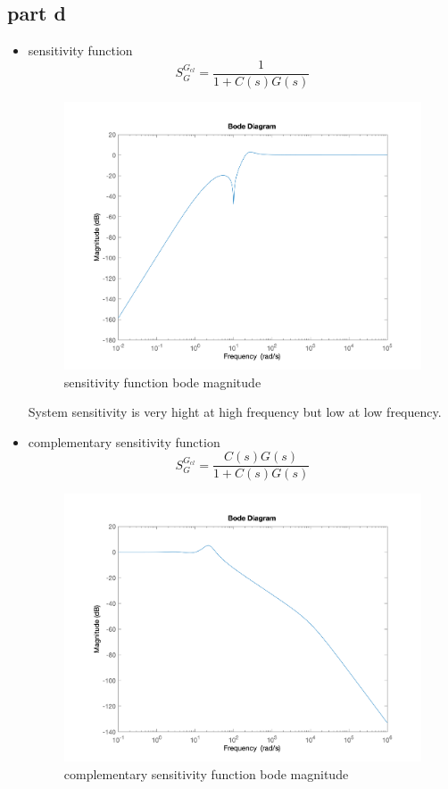 \subsection{part d}
\begin{itemize}
    \item sensitivity function
    $$
    S_G^{G_{cl}} = \dfrac{1}{1+C(s)G(s)}
    $$
    \begin{figure}[H]
        \caption{sensitivity function bode magnitude}
        \centering
        \includegraphics[width=12cm]{../Figure/Q1/Q1_d/sensitivity_func.png}
    \end{figure}
    System sensitivity is very hight at high frequency but low at low frequency.
    \item complementary sensitivity function 
    $$
    S_G^{G_{cl}} = \dfrac{C(s)G(s)}{1+C(s)G(s)}
    $$
    \begin{figure}[H]
        \caption{complementary sensitivity function bode magnitude}
        \centering
        \includegraphics[width=12cm]{../Figure/Q1/Q1_d/com_sensitivity_func.png}

\end{figure}
\end{itemize}

